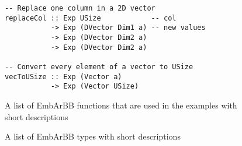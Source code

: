 \begin{figure}
\begin{small}
\begin{Verbatim}
-- Replace one column in a 2D vector 
replaceCol :: Exp USize            -- col
           -> Exp (DVector Dim1 a) -- new values
           -> Exp (DVector Dim2 a) 
           -> Exp (DVector Dim2 a) 

-- Convert every element of a vector to USize
vecToUSize :: Exp (Vector a) 
           -> Exp (Vector USize)

\end{Verbatim}
\end{small}
\caption{A list of EmbArBB functions that are used in the examples with 
         short descriptions} 
\label{fig:listoffun}
\end{figure} 

\begin{figure}
\caption{A list of EmbArBB types with short descriptions} 
\label{fig:listoftyp}
\end{figure} 



